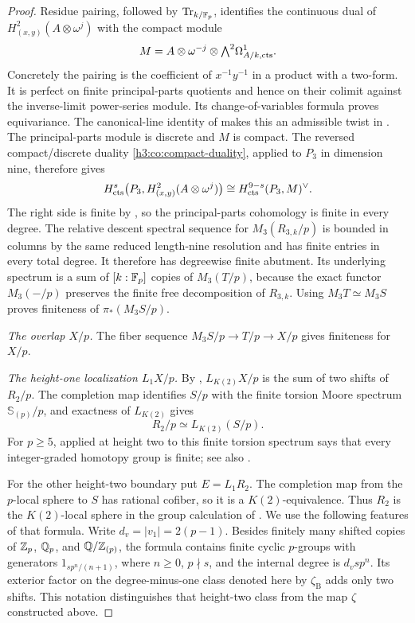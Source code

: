 \begin{proof}
Residue pairing, followed by \(\operatorname{Tr}_{k/\mathbb F_p}\), identifies the
continuous dual of
\(H^2_{(x,y)}(A\otimes\omega^j)\) with the compact module
\[
 M=A\otimes\omega^{-j}\otimes
       {\textstyle\bigwedge^2}\Omega^1_{A/k,\mathrm{cts}}.
\]
Concretely the pairing is the coefficient of \(x^{-1}y^{-1}\)
in a product with a two-form.  It is perfect on finite
principal-parts quotients and hence on their colimit against
the inverse-limit power-series module.  Its change-of-variables
formula proves equivariance.  The canonical-line identity of
 makes this an admissible twist
in .
The principal-parts module is discrete and \(M\) is compact.
The reversed compact/discrete duality
\eqref{h3:co:compact-duality}, applied to \(P_3\) in dimension nine,
therefore gives
\[
 H^s_{\mathrm{cts}}\bigl(P_3,H^2_{(x,y)}(A\otimes\omega^j)\bigr)
   \cong H^{9-s}_{\mathrm{cts}}(P_3,M)^\vee.
\]
The right side is finite by
, so the principal-parts
cohomology is finite in every degree.
The relative descent spectral sequence for
\(M_3(R_{3,k}/p)\) is bounded in columns by the same reduced
length-nine resolution and has finite entries in every total degree.
It therefore has degreewise finite abutment.  Its underlying spectrum
is a sum of \([k:\mathbb F_p]\) copies of \(M_3(T/p)\), because the exact
functor \(M_3(-/p)\) preserves the finite free decomposition of
\(R_{3,k}\).  Using \(M_3T\simeq M_3S\) proves finiteness of
\(\pi_*(M_3S/p)\).

\emph{The overlap \(X/p\).}
The fiber sequence \(M_3S/p\to T/p\to X/p\) gives finiteness
for \(X/p\).

\emph{The height-one localization \(L_1X/p\).}
By ,
\(L_{K(2)}X/p\) is the sum of two shifts of \(R_2/p\).
The completion map identifies \(S/p\) with the finite torsion Moore
spectrum \(\mathbb S_{(p)}/p\), and exactness of \(L_{K(2)}\) gives
\[
 R_2/p\simeq L_{K(2)}(S/p).
\]
For \(p\geq5\), \cite[Theorem~15.1]{HS99} applied at height two to this
finite torsion spectrum says that every integer-graded homotopy group is
finite; see also \cite[p.~49(c)]{BB}.

For the other height-two boundary put \(E=L_1R_2\).  The completion
map from the \(p\)-local sphere to \(S\) has rational cofiber, so it is
a \(K(2)\)-equivalence.  Thus \(R_2\) is the \(K(2)\)-local sphere in
the group calculation of \cite[Remark~7.8]{Behrens2012}.  We use the
following features of that formula.  Write \(d_v=|v_1|=2(p-1)\).
Besides finitely many shifted copies of \(\mathbb Z_p\), \(\mathbb Q_p\), and
\(\mathbb Q/\mathbb Z_{(p)}\), the formula contains finite cyclic \(p\)-groups with
generators \(1_{sp^n/(n+1)}\), where \(n\geq0\), \(p\nmid s\), and the
internal degree is \(d_vsp^n\).  Its exterior factor on the degree-minus-one
class denoted here by \(\zeta_{\mathrm B}\) adds only two shifts.  This
notation distinguishes that height-two class from the map \(\zeta\)
constructed above.


\end{proof}
